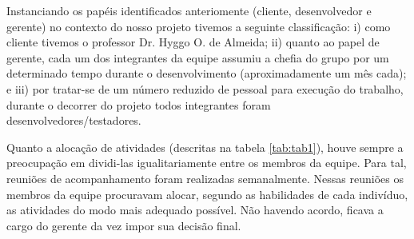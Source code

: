 
Instanciando os papéis identificados anteriomente (cliente, desenvolvedor e gerente) no contexto do nosso projeto tivemos a seguinte classificação: i) como cliente tivemos o professor Dr. Hyggo O. de Almeida; ii) quanto ao papel de gerente, cada um dos integrantes da equipe assumiu a chefia do grupo por um determinado tempo durante o desenvolvimento (aproximadamente um mês cada); e iii) por tratar-se de um número reduzido de pessoal para execução do trabalho, durante o decorrer do projeto todos integrantes foram desenvolvedores/testadores.

Quanto a alocação de atividades (descritas na tabela \ref{tab:tab1}), houve sempre a preocupação em dividi-las igualitariamente entre os membros da equipe. Para tal, reuniões de acompanhamento foram realizadas semanalmente. Nessas reuniões os membros da equipe procuravam alocar, segundo as habilidades de cada indivíduo, as atividades do modo mais adequado possível. Não havendo acordo, ficava a cargo do gerente da vez impor sua decisão final.

